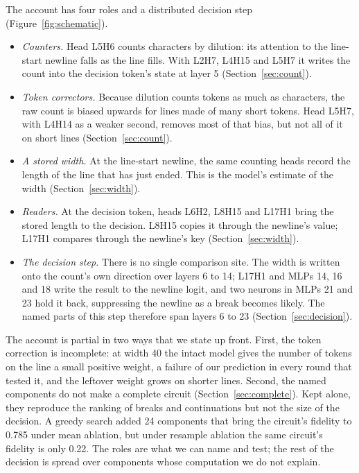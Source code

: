 \documentclass[11pt,a4paper]{article}
\begin{document}
The account has four roles and a distributed decision step (Figure~\ref{fig:schematic}).
\begin{itemize}
\item \emph{Counters.} Head L5H6 counts characters by dilution: its attention to the line-start newline falls as the line fills. With L2H7, L4H15 and L5H7 it writes the count into the decision token's state at layer 5 (Section~\ref{sec:count}).
\item \emph{Token correctors.} Because dilution counts tokens as much as characters, the raw count is biased upwards for lines made of many short tokens. Head L5H7, with L4H14 as a weaker second, removes most of that bias, but not all of it on short lines (Section~\ref{sec:count}).
\item \emph{A stored width.} At the line-start newline, the same counting heads record the length of the line that has just ended. This is the model's estimate of the width (Section~\ref{sec:width}).
\item \emph{Readers.} At the decision token, heads L6H2, L8H15 and L17H1 bring the stored length to the decision. L8H15 copies it through the newline's value; L17H1 compares through the newline's key (Section~\ref{sec:width}).
\item \emph{The decision step.} There is no single comparison site. The width is written onto the count's own direction over layers 6 to 14; L17H1 and MLPs 14, 16 and 18 write the result to the newline logit, and two neurons in MLPs 21 and 23 hold it back, suppressing the newline as a break becomes likely. The named parts of this step therefore span layers 6 to 23 (Section~\ref{sec:decision}).
\end{itemize}

The account is partial in two ways that we state up front. First, the token correction is incomplete: at width 40 the intact model gives the number of tokens on the line a small positive weight, a failure of our prediction in every round that tested it, and the leftover weight grows on shorter lines. Second, the named components do not make a complete circuit (Section~\ref{sec:complete}). Kept alone, they reproduce the ranking of breaks and continuations but not the size of the decision. A greedy search added 24 components that bring the circuit's fidelity to 0.785 under mean ablation, but under resample ablation the same circuit's fidelity is only 0.22. The roles are what we can name and test; the rest of the decision is spread over components whose computation we do not explain.
\end{document}
